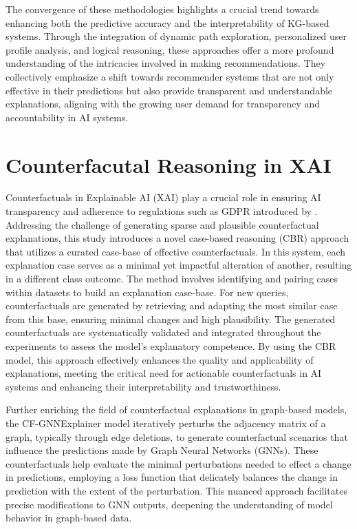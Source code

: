 The convergence of these methodologies highlights a crucial trend towards enhancing
both the predictive accuracy and the interpretability of KG-based systems.
Through the integration of dynamic path exploration, personalized user profile analysis,
and logical reasoning, these approaches offer a more profound understanding of the
intricacies involved in making recommendations. They collectively emphasize a
shift towards recommender systems that are not only effective in their
predictions but also provide transparent and understandable explanations, aligning
with the growing user demand for transparency and accountability in AI systems.

\section{Counterfacutal Reasoning in XAI}

Counterfactuals in Explainable AI (XAI) play a crucial role in ensuring AI
transparency and adherence to regulations such as GDPR introduced by \textcite{watson_good_2020}. Addressing the challenge
of generating sparse and plausible counterfactual explanations, this study
introduces a novel case-based reasoning (CBR) approach that utilizes a curated
case-base of effective counterfactuals. In this system, each explanation case
serves as a minimal yet impactful alteration of another, resulting in a different
class outcome. The method involves identifying and pairing cases within datasets
to build an explanation case-base. For new queries, counterfactuals are
generated by retrieving and adapting the most similar case from this base, ensuring
minimal changes and high plausibility. The generated counterfactuals are
systematically validated and integrated throughout the experiments to assess the
model’s explanatory competence. By using the CBR model, this approach
effectively enhances the quality and applicability of explanations, meeting the critical
need for actionable counterfactuals in AI systems and enhancing their interpretability
and trustworthiness.

Further enriching the field of counterfactual explanations in graph-based models,
the CF-GNNExplainer model \parencite{lucic_cf-gnnexplainer_2021} iteratively perturbs the adjacency matrix of a graph,
typically through edge deletions, to generate counterfactual scenarios that influence
the predictions made by Graph Neural Networks (GNNs). These counterfactuals help
evaluate the minimal perturbations needed to effect a change in predictions, employing
a loss function that delicately balances the change in prediction with the extent
of the perturbation. This nuanced approach facilitates precise modifications to
GNN outputs, deepening the understanding of model behavior in graph-based data.



